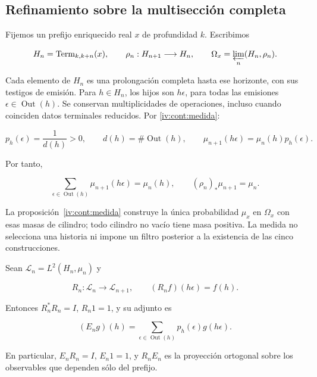 \subsection{Refinamiento sobre la multisección completa}

Fijemos un prefijo enriquecido real \(x\) de profundidad \(k\). Escribimos

\[
H_n=\operatorname{Term}_{k,k+n}(x),\qquad
\rho_n:H_{n+1}\longrightarrow H_n,
\qquad \Omega_x=\varprojlim_n(H_n,\rho_n).
\]

Cada elemento de \(H_n\) es una prolongación completa hasta ese horizonte, con sus testigos de emisión. Para \(h\in H_n\), los hijos son \(h\epsilon\), para todas las emisiones \(\epsilon\in\operatorname{Out}(h)\). Se conservan multiplicidades de operaciones, incluso cuando coinciden datos terminales reducidos. Por \cref{iv:cont:medida}:

\[
p_h(\epsilon)=\frac1{d(h)}>0,\qquad
d(h)=\#\operatorname{Out}(h),\qquad
\mu_{n+1}(h\epsilon)=\mu_n(h)p_h(\epsilon).
\]

Por tanto,

\begin{equation}
\sum_{\epsilon\in\operatorname{Out}(h)}\mu_{n+1}(h\epsilon)=\mu_n(h),
\qquad (\rho_n)_*\mu_{n+1}=\mu_n.
\label{nuc01:eq:1}
\end{equation}

La proposición~\ref{iv:cont:medida} construye la única probabilidad \(\mu_x\) en \(\Omega_x\) con esas masas de cilindro; todo cilindro no vacío tiene masa positiva. La medida no selecciona una historia ni impone un filtro posterior a la existencia de las cinco construcciones.

\begin{proposition}
\label{nuc01:pullback}

Sean \(\mathscr L_n=L^2(H_n,\mu_n)\) y

\[
R_n:\mathscr L_n\longrightarrow\mathscr L_{n+1},\qquad
(R_nf)(h\epsilon)=f(h).
\]

Entonces \(R_n^*R_n=I\), \(R_n1=1\), y su adjunto es

\begin{equation}
(E_ng)(h)=\sum_{\epsilon\in\operatorname{Out}(h)}p_h(\epsilon)g(h\epsilon).
\label{nuc01:eq:2}
\end{equation}

En particular, \(E_nR_n=I\), \(E_n1=1\), y \(R_nE_n\) es la proyección ortogonal sobre los observables que dependen sólo del prefijo.
\end{proposition}

